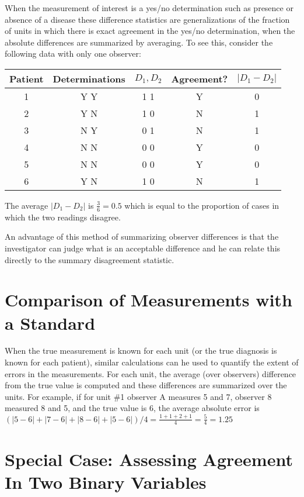 When the measurement of interest is a yes/no determination such as
presence or absence of a disease these difference statistics are generalizations of the fraction of units in which there is exact agreement in the yes/no
determination, when the absolute differences are summarized by averaging. To
see this, consider the following data with only one observer:
\begin{center}\begin{tabular}{ccccc}
Patient & Determinations & $D_{1}, D_{2}$ & Agreement? & $|D_{1} -D_{2}|$\\ \hline
1 &Y Y& 1 1&Y&0\\
2 &Y N& 1 0&N&1\\
3 &N Y& 0 1&N&1\\
4 &N N& 0 0&Y&0\\
5 &N N& 0 0&Y&0\\
6 &Y N& 1 0&N&1\\ \hline
\end{tabular}\end{center}
The average $|D_{1} - D_{2}|$ is $\frac{3}{6} = 0.5$ which is equal to the
proportion of cases in which the two readings disagree.

An advantage of this method of summarizing observer differences is that
the investigator can judge what is an acceptable difference and he can relate
this directly to the summary disagreement statistic.

\section{Comparison of Measurements with a Standard}
When the true measurement is known for each unit (or the true diagnosis
is known for each patient), similar calculations can he used to quantify the
extent of errors in the measurements. For each unit, the average (over
observers) difference from the true value is computed and these differences
are summarized over the units. For example, if for unit \#1 observer A measures 5 and 7, observer 8 measured 8 and 5, and the true value is 6, the
average absolute error is $(|5-6|+|7-6|+ |8-6|+|5-6|)/4 = \frac{1+1+2+1}{4}
= \frac{5}{4} = 1.25$

\section{Special Case: Assessing Agreement In Two Binary Variables}
